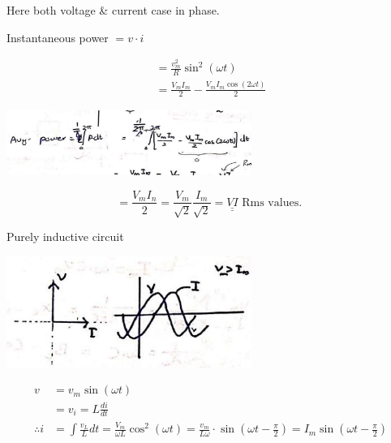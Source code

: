 \documentclass[12pt, a4paper]{article}
\newcommand{\figwidth}{8cm}
\begin{document}
	Here both voltage \& current case in phase.

	Instantaneous power $=v \cdot i$

	$$
		\begin{gathered}
			=\frac{v_{m}^{2}}{R} \sin ^{2}(\omega t) \\
			=\frac{V_{m} I_{m}}{2}-\frac{V_{m} I_{m} \cos (2 \omega t)}{2}
		\end{gathered}
	$$

	\begin{center}
		\includegraphics[max width=\figwidth]{2024_06_15_74bbabba7981675b0d49g-05(3)}
	\end{center}

	$$
		=\frac{V_{m} I_{n}}{2}=\frac{V_{m}}{\sqrt{2}} \frac{I_{m}}{\sqrt{2}}=\underline{\underline{V I}} \text { Rms values. }
	$$

	Purely inductive circuit

	\begin{center}
		\includegraphics[max width=\figwidth]{2024_06_15_74bbabba7981675b0d49g-05(2)}
	\end{center}

	$$
		\begin{aligned}
			v            & =v_{m} \sin (\omega t)                                                                                                                                                                    \\
			             & =v_{i}=L \frac{d i}{d t}                                                                                                                                                                  \\
			\therefore i & =\int \frac{v_{L}}{L} d t=\frac{V_{m}}{\omega L} \cos ^{2}(\omega t)=\frac{v_{m}}{L \omega} \cdot \sin \left(\omega t-\frac{\pi}{2}\right)=I_{m} \sin \left(\omega t-\frac{\pi}{2}\right)
		\end{aligned}
	$$
\end{document}
